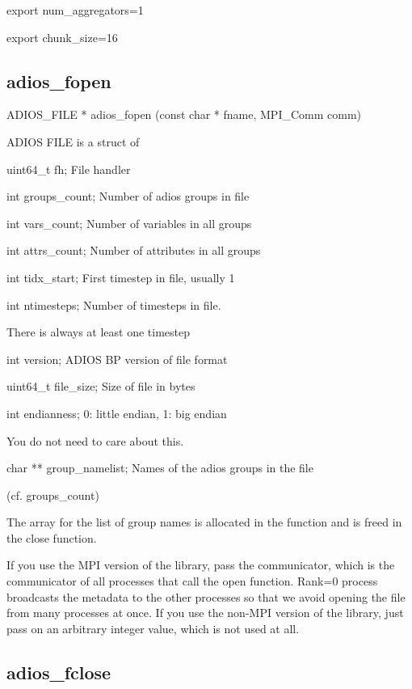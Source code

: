 export num\_aggregators=1

export chunk\_size=16\label{HToc182553401}

\subsection{adios\_fopen }

ADIOS\_FILE * adios\_fopen (const char * fname, MPI\_Comm comm)

ADIOS FILE is a struct of

\leftskip=22pt
uint64\_t fh; File handler

int groups\_count; Number of adios groups in file      

int vars\_count; Number of variables in all groups  

int attrs\_count; Number of attributes in all groups

int tidx\_start; First timestep in file, usually 1

int ntimesteps; Number of timesteps in file. 

\parindent=39pt
There is always at least one timestep

\parindent=0pt
int version; ADIOS BP version of file format  

uint64\_t file\_size;  Size of file in bytes 

int  endianness;  0: little endian, 1: big endian 

\parindent=39pt
You do not need to care about this.

\parindent=0pt
char   **  group\_namelist; Names of the adios groups in the file 

\parindent=39pt
(cf. groups\_count)

\leftskip=0pt
\parindent=0pt
The array for the list of group names is allocated in the function and is freed 
in the close function.

If you use the MPI version of the library, pass the communicator, which is the 
communicator of all processes that call the open function. Rank=0 process broadcasts 
the metadata to the other processes so that we avoid opening the file from many 
processes at once.  If you use the non-MPI version of the library, just pass on 
an arbitrary integer value, which is not used at all. \label{HToc182553402}

\subsection{adios\_fclose}

